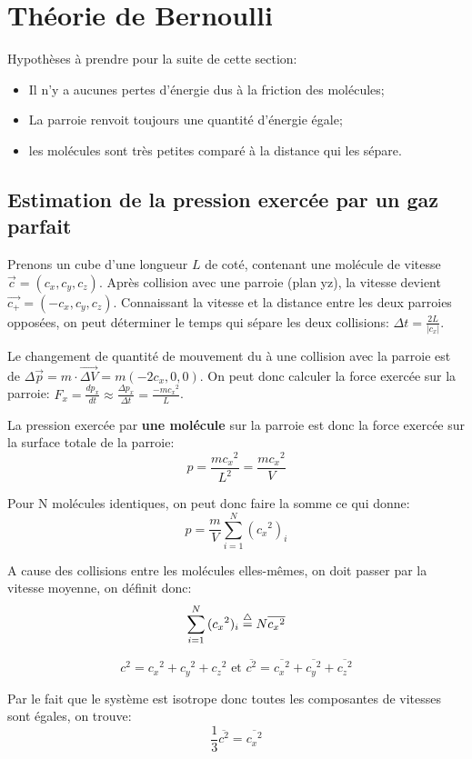 \section{Théorie de Bernoulli}
Hypothèses à prendre pour la suite de cette section:
\begin{itemize}
 \item Il n'y a aucunes pertes d'énergie dus à la friction des molécules;
 \item La parroie renvoit toujours une quantité d'énergie égale;
 \item les molécules sont très petites comparé à la distance qui les sépare.
\end{itemize}

\subsection{Estimation de la pression exercée par un gaz parfait}
Prenons un cube d'une longueur $L$ de coté, contenant une molécule de vitesse $\vec{c} = (c_x, c_y, c_z)$. Après collision avec une parroie (plan yz), la vitesse devient $\vec{c_+} = (-c_x, c_y, c_z)$.
Connaissant la vitesse et la distance entre les deux parroies opposées, on peut déterminer le temps qui sépare les deux collisions: $\Delta t = \frac{2L}{|c_x|}$.

Le changement de quantité de mouvement du à une collision avec la parroie est de $\Delta \vec{p} = m \cdot \vec{\Delta V} = m(-2c_x, 0, 0)$. On peut donc calculer la force exercée sur la parroie: $F_x = \frac{dp_x}{dt} \approx \frac{\Delta p_x}{\Delta t} = \frac{-m{c_x}^2}{L}$.

La pression exercée par {\bf une molécule} sur la parroie est donc la force exercée sur la surface totale de la parroie: $$p = \frac{m{c_x}^2}{L^2} = \frac{m{c_x}^2}{V}$$

Pour N molécules identiques, on peut donc faire la somme ce qui donne:
$$p = \frac{m}{V} \sum_{i=1}^{N}{({c_x}^2)_i}$$

A cause des collisions entre les molécules elles-mêmes, on doit passer par la vitesse moyenne, on définit donc: $$ \sum_{i=1}^{N}{({c_x}^2)_i} \buildrel\triangle\over = N \overline{{c_x}^2}$$ 


$$c^2 = {c_x}^2 + {c_y}^2 + {c_z}^2 \textrm{ et }\overline{c^2} = \overline{{c_x}^2} + \overline{{c_y}^2} + \overline{{c_z}^2}$$

Par le fait que le système est isotrope donc toutes les composantes de vitesses sont égales, on trouve: 
$$ \frac{1}{3}\overline{c^2} = \overline{{c_x}^2} $$

